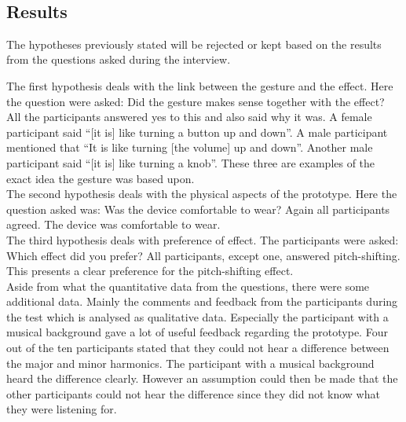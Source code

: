 \begin{minipage}{\linewidth}%
\label{Setup}
\end{minipage}\\

\subsection{Results}
The hypotheses previously stated will be rejected or kept based on the results from the questions asked during the interview.

The first hypothesis deals with the link between the gesture and the effect. Here the question were asked: Did the gesture makes sense together with the effect? All the participants answered yes to this and also said why it was. A female participant said “[it is] like turning a button up and down”. A male participant mentioned that “It is like turning [the volume] up and down”. Another male participant said “[it is] like turning a knob”. These three are examples of the exact idea the gesture was based upon.\\ 

The second hypothesis deals with the physical aspects of the prototype. Here the question asked was: Was the device comfortable to wear? Again all participants agreed. The device was comfortable to wear. \\

The third hypothesis deals with preference of effect. The participants were asked: Which effect did you prefer? All participants, except one, answered pitch-shifting. This presents a clear preference for the pitch-shifting effect. \\

Aside from what the quantitative data from the questions, there were some additional data. Mainly the comments and feedback from the participants during the test which is analysed as qualitative data. Especially the participant with a musical background gave a lot of useful feedback regarding the prototype. Four out of the ten participants stated that they could not hear a difference between the major and minor harmonics. The participant with a musical background heard the difference clearly. However an assumption could then be made that the other participants could not hear the difference since they did not know what they were listening for. \\

